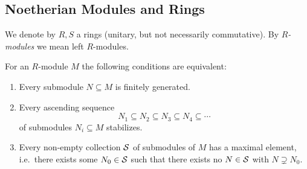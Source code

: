\subsection{Noetherian Modules and Rings}


\begin{conventions}
  We denote by $R, S$ a rings (unitary, but not necessarily commutative).
  By \emph{$R$-modules} we mean left $R$-modules.
\end{conventions}


\begin{lemma}
  For an $R$-module $M$ the following conditions are equivalent:
  \begin{enumerate}
    \item
      Every submodule $N \subseteq M$ is finitely generated.
    \item
      Every ascending sequence
      \[
                  N_1
        \subseteq N_2
        \subseteq N_3
        \subseteq N_4
        \subseteq \dotsb
      \]
      of submodules $N_i \subseteq M$ stabilizes.
    \item
      Every non-empty collection $\mathcal{S}$ of submodules of $M$ has a maximal element, i.e.\ there exists some $N_0 \in \mathcal{S}$ such that there exists no $N \in \mathcal{S}$ with $N \supsetneq N_0$.
  \end{enumerate}
\end{lemma}


